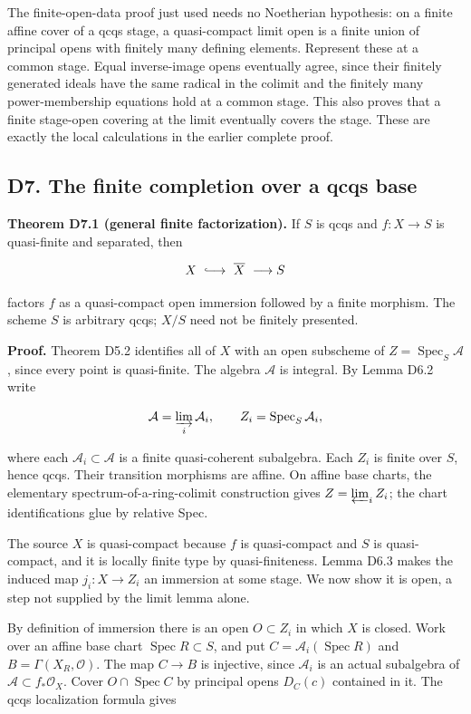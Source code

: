 \documentclass[11pt,a4paper,openany]{report}
\begin{document}
The finite-open-data proof just used needs no Noetherian hypothesis: on a finite affine cover of a qcqs stage, a quasi-compact limit open is a finite union of principal opens with finitely many defining elements. Represent these at a common stage. Equal inverse-image opens eventually agree, since their finitely generated ideals have the same radical in the colimit and the finitely many power-membership equations hold at a common stage. This also proves that a finite stage-open covering at the limit eventually covers the stage. These are exactly the local calculations in the earlier complete proof.

\subsection{D7. The finite completion over a qcqs base}\label{AG-RG-S04-d7.-the-finite-completion-over-a-qcqs-base}

\textbf{Theorem D7.1 (general finite factorization).} If \(S\) is qcqs and \(f:X\to S\) is quasi-finite and separated, then

\[
X\ \lhook\joinrel\longrightarrow\ \overline X\ \longrightarrow S
\]

factors \(f\) as a quasi-compact open immersion followed by a finite morphism. The scheme \(S\) is arbitrary qcqs; \(X/S\) need not be finitely presented.

\textbf{Proof.} Theorem D5.2 identifies all of \(X\) with an open subscheme of \(Z=\operatorname{Spec}_S\mathcal A\), since every point is quasi-finite. The algebra \(\mathcal A\) is integral. By Lemma D6.2 write

\[
\mathcal A=\varinjlim_i\mathcal A_i,\qquad
Z_i=\operatorname{Spec}_S\mathcal A_i,
\]

where each \(\mathcal A_i\subset\mathcal A\) is a finite quasi-coherent subalgebra. Each \(Z_i\) is finite over \(S\), hence qcqs. Their transition morphisms are affine. On affine base charts, the elementary spectrum-of-a-ring-colimit construction gives \(Z=\varprojlim_iZ_i\); the chart identifications glue by relative Spec.

The source \(X\) is quasi-compact because \(f\) is quasi-compact and \(S\) is quasi-compact, and it is locally finite type by quasi-finiteness. Lemma D6.3 makes the induced map \(j_i:X\to Z_i\) an immersion at some stage. We now show it is open, a step not supplied by the limit lemma alone.

By definition of immersion there is an open \(O\subset Z_i\) in which \(X\) is closed. Work over an affine base chart \(\operatorname{Spec}R\subset S\), and put \(C=\mathcal A_i(\operatorname{Spec}R)\) and \(B=\Gamma(X_R,\mathcal O)\). The map \(C\to B\) is injective, since \(\mathcal A_i\) is an actual subalgebra of \(\mathcal A\subset f_*\mathcal O_X\). Cover \(O\cap\operatorname{Spec}C\) by principal opens \(D_C(c)\) contained in it. The qcqs localization formula gives
\end{document}
